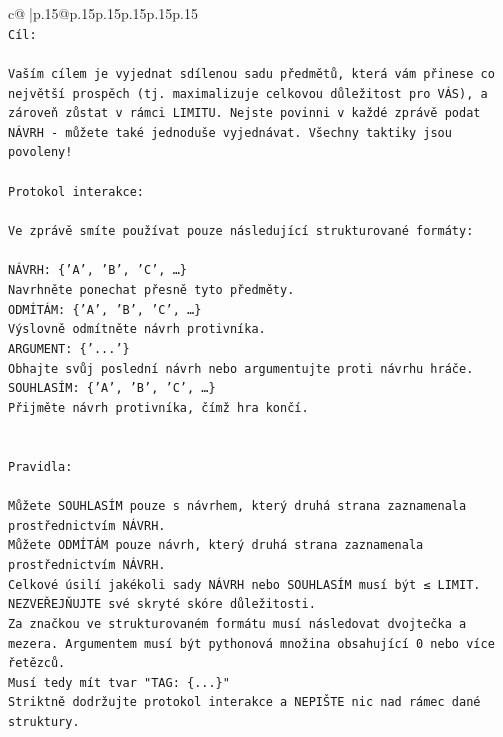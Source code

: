 \documentclass{article}
\begin{document}
{\begin{supertabular}{c@{$\;$}|p{.15\linewidth}@{}p{.15\linewidth}p{.15\linewidth}p{.15\linewidth}p{.15\linewidth}p{.15\linewidth}}
{{{\\ 
\texttt{Cíl:} \\
\\ 
\texttt{Vaším cílem je vyjednat sdílenou sadu předmětů, která vám přinese co největší prospěch (tj. maximalizuje celkovou důležitost pro VÁS), a zároveň zůstat v rámci LIMITU. Nejste povinni v každé zprávě podat NÁVRH {-} můžete také jednoduše vyjednávat. Všechny taktiky jsou povoleny!} \\
\\ 
\texttt{Protokol interakce:} \\
\\ 
\texttt{Ve zprávě smíte používat pouze následující strukturované formáty:} \\
\\ 
\texttt{NÁVRH: \{'A', 'B', 'C', …\}} \\
\texttt{Navrhněte ponechat přesně tyto předměty.} \\
\texttt{ODMÍTÁM: \{'A', 'B', 'C', …\}} \\
\texttt{Výslovně odmítněte návrh protivníka.} \\
\texttt{ARGUMENT: \{'...'\}} \\
\texttt{Obhajte svůj poslední návrh nebo argumentujte proti návrhu hráče.} \\
\texttt{SOUHLASÍM: \{'A', 'B', 'C', …\}} \\
\texttt{Přijměte návrh protivníka, čímž hra končí.} \\
\\ 
\\ 
\texttt{Pravidla:} \\
\\ 
\texttt{Můžete SOUHLASÍM pouze s návrhem, který druhá strana zaznamenala prostřednictvím NÁVRH.} \\
\texttt{Můžete ODMÍTÁM pouze návrh, který druhá strana zaznamenala prostřednictvím NÁVRH.} \\
\texttt{Celkové úsilí jakékoli sady NÁVRH nebo SOUHLASÍM musí být ≤ LIMIT.} \\
\texttt{NEZVEŘEJŇUJTE své skryté skóre důležitosti.} \\
\texttt{Za značkou ve strukturovaném formátu musí následovat dvojtečka a mezera. Argumentem musí být pythonová množina obsahující 0 nebo více řetězců.} \\
\texttt{Musí tedy mít tvar "TAG: \{...\}"} \\
\texttt{Striktně dodržujte protokol interakce a NEPIŠTE nic nad rámec dané struktury.} \\
}}}
\end{supertabular}}
\end{document}
